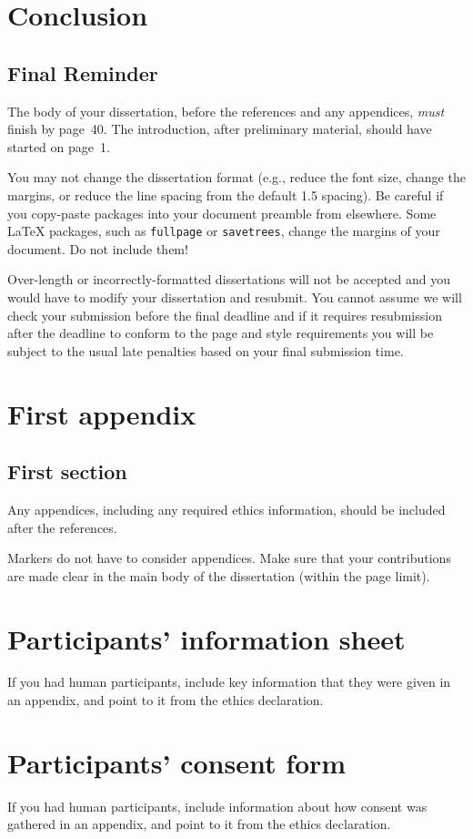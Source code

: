 \documentclass[logo,msc,cyber]{infthesis}   %
\begin{document}
\chapter{Conclusion}

\section{Final Reminder}

The body of your dissertation, before the references and any appendices,
\emph{must} finish by page~40. The introduction, after preliminary material,
should have started on page~1.

You may not change the dissertation format (e.g., reduce the font size, change
the margins, or reduce the line spacing from the default 1.5 spacing). Be
careful if you copy-paste packages into your document preamble from elsewhere.
Some \LaTeX{} packages, such as \texttt{fullpage} or \texttt{savetrees}, change
the margins of your document. Do not include them!

Over-length or incorrectly-formatted dissertations will not be accepted and you
would have to modify your dissertation and resubmit. You cannot assume we will
check your submission before the final deadline and if it requires resubmission
after the deadline to conform to the page and style requirements you will be
subject to the usual late penalties based on your final submission time.





\appendix

\chapter{First appendix}

\section{First section}

Any appendices, including any required ethics information, should be included
after the references.

Markers do not have to consider appendices. Make sure that your contributions
are made clear in the main body of the dissertation (within the page limit).

\chapter{Participants' information sheet}

If you had human participants, include key information that they were given in
an appendix, and point to it from the ethics declaration.

\chapter{Participants' consent form}

If you had human participants, include information about how consent was
gathered in an appendix, and point to it from the ethics declaration.
\end{document}
